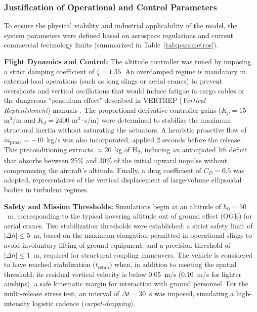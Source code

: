 \documentclass[aerospace,article,submit,pdftex,moreauthors]{Definitions/mdpi}
\begin{document}
\subsubsection{Justification of Operational and Control Parameters}
To ensure the physical viability and industrial applicability of the model, the system parameters were defined based on aerospace regulations and current commercial technology limits (summarized in Table~\ref{tab:parametros}).

\textbf{Flight Dynamics and Control:} The altitude controller was tuned by imposing a strict damping coefficient of $\zeta = 1.35$. An overdamped regime is mandatory in external-load operations (such as long slings or aerial cranes) to prevent overshoots and vertical oscillations that would induce fatigue in cargo cables or the dangerous "pendulum effect" described in VERTREP (\textit{Vertical Replenishment}) manuals \cite{ref7, ref8}. The proportional-derivative controller gains ($K_p = 15$ m$^3$/m and $K_d = 2400$ m$^3 \cdot$s/m) were determined to stabilize the maximum structural inertia without saturating the actuators. A heuristic proactive flow of $\dot{m}_\text{proac} = -10$~kg/s was also incorporated, applied 2 seconds before the release. This preconditioning extracts ${\approx}20$~kg of H\textsubscript{2}, inducing an anticipated lift deficit that absorbs between 25\% and 30\% of the initial upward impulse without compromising the aircraft's altitude. Finally, a drag coefficient of $C_D = 0.5$ was adopted, representative of the vertical displacement of large-volume ellipsoidal bodies in turbulent regimes.

\textbf{Safety and Mission Thresholds:} Simulations begin at an altitude of $h_0 = 50$~m, corresponding to the typical hovering altitude out of ground effect (OGE) for aerial cranes. Two stabilization thresholds were established: a strict safety limit of $|\Delta h| \le 5$~m, based on the maximum elongation permitted in operational slings to avoid involuntary lifting of ground equipment; and a precision threshold of $|\Delta h| \le 1$~m, required for structural coupling maneuvers. The vehicle is considered to have reached stabilization ($t_\text{estab}$) when, in addition to meeting the spatial threshold, its residual vertical velocity is below $0.05$~m/s ($0.10$~m/s for lighter airships), a safe kinematic margin for interaction with ground personnel. For the multi-release stress test, an interval of $\Delta t = 30$~s was imposed, simulating a high-intensity logistic cadence (\textit{carpet-dropping}).
\end{document}

